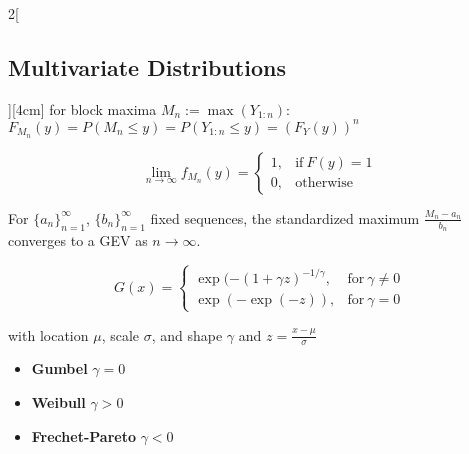 \documentclass[8pt]{extarticle}
\begin{document}
\begin{multicols}{2}[\subsection{Multivariate Distributions}][4cm]
 \noindent for block maxima $M_n := \max(Y_{1:n})$: $F_{M_n}(y) = P(M_n\leq y) = P(Y_{1:n}\leq y) = (F_Y(y))^n$
 
 $$ \underset{n\rightarrow \infty}{\lim}f_{M_n}(y) =  \begin{cases}
      1, & \text{if}\ F(y)=1 \\
      0, & \text{otherwise}
    \end{cases}$$
    
    \noindent For $\{a_n\}^\infty_{n=1}$, $\{b_n\}^\infty_{n=1}$ fixed sequences, the standardized maximum $\frac{M_n - a_n}{b_n}$ converges to a GEV as $n\rightarrow\infty$.
    
    $$G(x) = \begin{cases}
      \exp(-(1+\gamma z)^{-1/\gamma}, & \text{for}\ \gamma \neq 0 \\
      \exp(-\exp(-z)), & \text{for}\ \gamma = 0 
    \end{cases}$$
    
    with location $\mu$, scale $\sigma$, and shape $\gamma$ and $z=\frac{x-\mu}{\sigma}$
    
    
  \begin{itemize}
  \item \textbf{Gumbel} $\gamma=0$
  \item \textbf{Weibull} $\gamma> 0$
  \item \textbf{Frechet-Pareto} $\gamma<0$
  \end{itemize}
    
    
    
 
 
 
 
 
 







\end{multicols}
\end{document}
